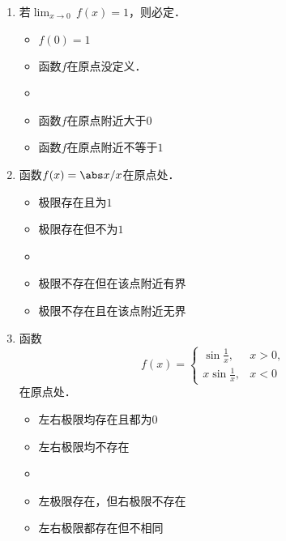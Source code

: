 \begin{enumerate}
\item 若\(\lim_{x\to0} \,f(x) = 1\)，则必定\uline{\makebox[6em]{}}．
  \begin{itemize}
    \renewcommand{\labelitemi}{\faCircleThin}
  \item \(f(0) = 1\)
  \item 函数\(f\)在原点没定义．
    \ifshowsol
    \item[\faCircle]
    \else
    \item
    \fi
    函数\(f\)在原点附近大于\(0\)
  \item 函数\(f\)在原点附近不等于\(1\)
  \end{itemize}

\item 函数\(f(x) = \abs x / x\)在原点处\uline{\makebox[6em]{}}．
  \begin{itemize}
    \renewcommand{\labelitemi}{\faCircleThin}
  \item 极限存在且为\(1\)
  \item 极限存在但不为\(1\)
    \ifshowsol
    \item[\faCircle]
    \else
    \item
    \fi
    极限不存在但在该点附近有界
  \item 极限不存在且在该点附近无界
  \end{itemize}

\item 函数
  \begin{equation*}
    f(x) =
    \begin{cases}
      \sin\frac1x, & x > 0, \\
      x \sin\frac1x, & x < 0
    \end{cases}
  \end{equation*}
  在原点处\uline{\makebox[6em]{}}．
  \begin{itemize}
    \renewcommand{\labelitemi}{\faCircleThin}
  \item 左右极限均存在且都为\(0\)
  \item 左右极限均不存在
    \ifshowsol
    \item[\faCircle]
    \else
    \item
    \fi
    左极限存在，但右极限不存在
  \item 左右极限都存在但不相同
  \end{itemize}


\end{enumerate}
